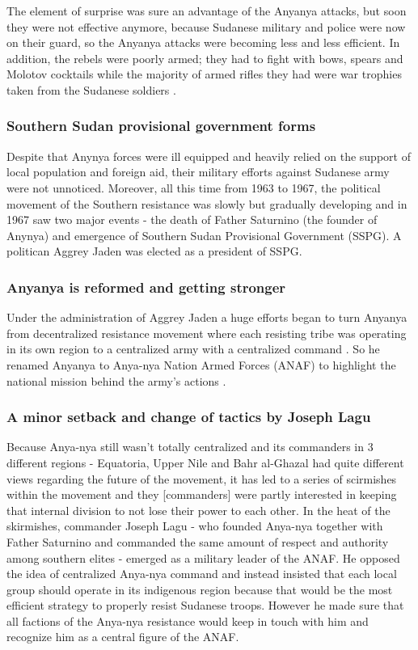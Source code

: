 \documentclass[14pt,a4paper]{article}
\begin{document}
The element of surprise was sure an advantage of the Anyanya attacks, but soon they were not effective anymore, because Sudanese military and police were now on their guard, so the Anyanya attacks were becoming less and less efficient. In addition, the rebels were poorly armed; they had to fight with bows, spears and Molotov cocktails while the majority of armed rifles they had were war trophies taken from the Sudanese soldiers \cite{rolandsen2011making}. 

\subsubsection{Southern Sudan provisional government forms}

Despite that Anynya forces were ill equipped and heavily relied on the support of local population and foreign aid, their military efforts against Sudanese army were not unnoticed. Moreover, all this time from 1963 to 1967, the political movement of the Southern resistance was slowly but gradually developing and in 1967 saw two major events - the death of Father Saturnino (the founder of Anynya) and emergence of Southern Sudan Provisional Government (SSPG).
A politican Aggrey Jaden was elected as a president of SSPG.

\subsubsection{Anyanya is reformed and getting stronger}

Under the administration of Aggrey Jaden a huge efforts began to turn Anyanya from decentralized resistance movement where each resisting tribe was operating in its own region to a centralized army with a centralized command \cite{poggo2008first}. So he renamed Anyanya to Anya-nya Nation Armed Forces (ANAF) to highlight the national mission behind the army's actions \cite{poggo2008first}. 

\subsubsection {A minor setback and change of tactics by Joseph Lagu}

Because Anya-nya still wasn't totally centralized and its commanders in 3 different regions - Equatoria, Upper Nile and Bahr al-Ghazal had quite different views regarding the future of the movement, it has led to a series of scirmishes within the movement and they [commanders] were partly interested in keeping that internal division to not lose their power to each other. \cite{poggo2008first}
In the heat of the skirmishes, commander Joseph Lagu - who founded Anya-nya together with Father Saturnino and commanded the same amount of respect and authority among southern elites - emerged as a military leader of the ANAF. He opposed the idea of centralized Anya-nya command and instead insisted that each local group should operate in its indigenous region because that would be the most efficient strategy to properly resist Sudanese troops. However he made sure that all factions of the Anya-nya resistance would keep in touch with him and recognize him as a central figure of the ANAF. 
\end{document}

